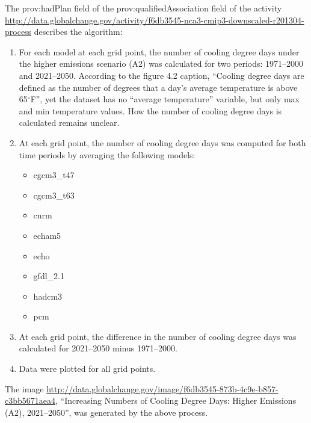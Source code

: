 The prov:hadPlan field of the prov:qualifiedAssociation field of the activity \url{http://data.globalchange.gov/activity/f6db3545-nca3-cmip3-downscaled-r201304-process} describes the algorithm:
\begin{enumerate}
\item For each model at each grid point, the number of cooling degree days under the higher emissions scenario (A2) was calculated for two periods: 1971--2000 and 2021--2050. According to the figure 4.2 caption, ``Cooling degree days are defined as the number of degrees that a day's average temperature is above 65$^{\circ}$F'', yet the dataset has no ``average temperature'' variable, but only max and min temperature values. How the number of cooling degree days is calculated remains unclear.
\item At each grid point, the number of cooling degree days was computed for both time periods by averaging the following models:
\begin{itemize}
\item cgcm3\_t47
\item cgcm3\_t63
\item cnrm
\item echam5
\item echo
\item gfdl\_2.1
\item hadcm3
\item pcm
\end{itemize}

\item At each grid point, the difference in the number of cooling degree days was calculated for 2021--2050 minus 1971--2000.
\item Data were plotted for all grid points.
\end{enumerate}

The image \url{http://data.globalchange.gov/image/f6db3545-873b-4c9e-b857-c3bb5671aea4}, ``Increasing Numbers of Cooling Degree Days: Higher Emissions (A2), 2021--2050'', was generated by the above process.

